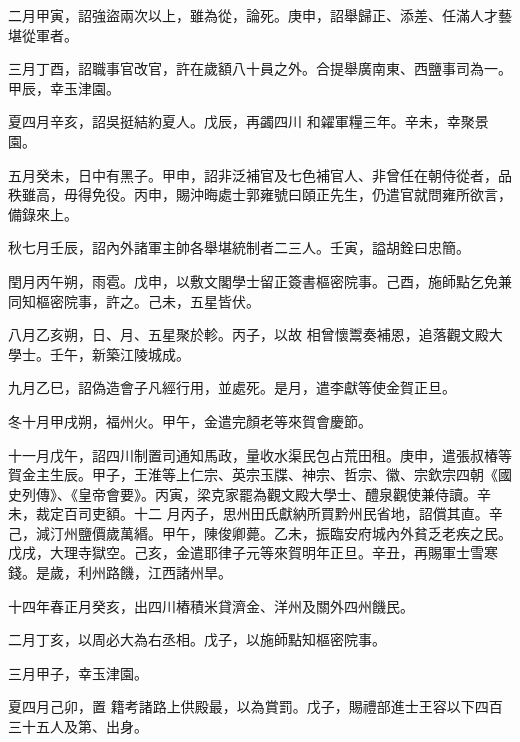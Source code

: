 \begin{pinyinscope}
 二月甲寅，詔強盜兩次以上，雖為從，論死。庚申，詔舉歸正、添差、任滿人才藝堪從軍者。



 三月丁酉，詔職事官改官，許在歲額八十員之外。合提舉廣南東、西鹽事司為一。甲辰，幸玉津園。



 夏四月辛亥，詔吳挺結約夏人。戊辰，再蠲四川
 和糴軍糧三年。辛未，幸聚景園。



 五月癸未，日中有黑子。甲申，詔非泛補官及七色補官人、非曾任在朝侍從者，品秩雖高，毋得免役。丙申，賜沖晦處士郭雍號曰頤正先生，仍遣官就問雍所欲言，備錄來上。



 秋七月壬辰，詔內外諸軍主帥各舉堪統制者二三人。壬寅，謚胡銓曰忠簡。



 閏月丙午朔，雨雹。戊申，以敷文閣學士留正簽書樞密院事。己酉，施師點乞免兼同知樞密院事，許之。己未，五星皆伏。



 八月乙亥朔，日、月、五星聚於軫。丙子，以故
 相曾懷鬻奏補恩，追落觀文殿大學士。壬午，新築江陵城成。



 九月乙巳，詔偽造會子凡經行用，並處死。是月，遣李獻等使金賀正旦。



 冬十月甲戌朔，福州火。甲午，金遣完顏老等來賀會慶節。



 十一月戊午，詔四川制置司通知馬政，量收水渠民包占荒田租。庚申，遣張叔椿等賀金主生辰。甲子，王淮等上仁宗、英宗玉牒、神宗、哲宗、徽、宗欽宗四朝《國史列傳》、《皇帝會要》。丙寅，梁克家罷為觀文殿大學士、醴泉觀使兼侍讀。辛未，裁定百司吏額。十二
 月丙子，思州田氏獻納所買黔州民省地，詔償其直。辛己，減汀州鹽價歲萬緡。甲午，陳俊卿薨。乙未，振臨安府城內外貧乏老疾之民。戊戌，大理寺獄空。己亥，金遣耶律子元等來賀明年正旦。辛丑，再賜軍士雪寒錢。是歲，利州路饑，江西諸州旱。



 十四年春正月癸亥，出四川樁積米貸濟金、洋州及關外四州饑民。



 二月丁亥，以周必大為右丞相。戊子，以施師點知樞密院事。



 三月甲子，幸玉津園。



 夏四月己卯，置
 籍考諸路上供殿最，以為賞罰。戊子，賜禮部進士王容以下四百三十五人及第、出身。




\end{pinyinscope}
